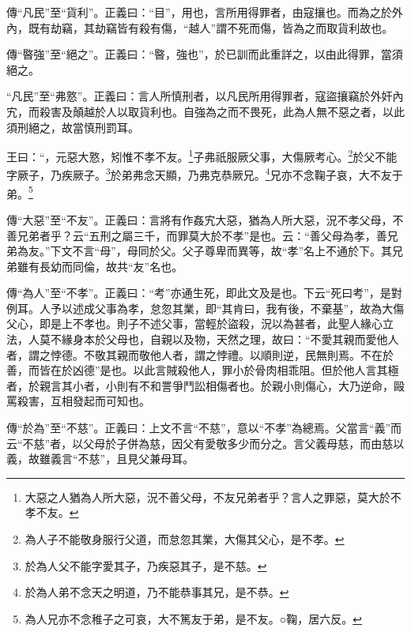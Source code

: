 {\noindent\zhuan{}\fzbyks 傳“凡民”至“貨利”。正義曰：“目”，用也，言所用得罪者，由寇攘也。而為之於外內，既有劫竊，其劫竊皆有殺有傷，“越人”謂不死而傷，皆為之而取貨利故也。 \par}

{\noindent\zhuan{}\fzbyks 傳“暋強”至“絕之”。正義曰：“暋，強也”，於已訓而此重詳之，以由此得罪，當須絕之。 \par}

{\noindent\shu{}\fzkt “凡民”至“弗憝”。正義曰：言人所慎刑者，以凡民所用得罪者，寇盜攘竊於外奸內宄，而殺害及顛越於人以取貨利也。自強為之而不畏死，此為人無不惡之者，以此須刑絕之，故當慎刑罰耳。 \par}

王曰：“，元惡大憝，矧惟不孝不友。\footnote{大惡之人猶為人所大惡，況不善父母，不友兄弟者乎？言人之罪惡，莫大於不孝不友。}子弗祇服厥父事，大傷厥考心。\footnote{為人子不能敬身服行父道，而怠忽其業，大傷其父心，是不孝。}於父不能字厥子，乃疾厥子。\footnote{於為人父不能字愛其子，乃疾惡其子，是不慈。}於弟弗念天顯，乃弗克恭厥兄。\footnote{於為人弟不念天之明道，乃不能恭事其兄，是不恭。}兄亦不念鞠子哀，大不友于弟。\footnote{為人兄亦不念稚子之可哀，大不篤友于弟，是不友。○鞠，居六反。}


{\noindent\zhuan{}\fzbyks 傳“大惡”至“不友”。正義曰：言將有作姦宄大惡，猶為人所大惡，況不孝父母，不善兄弟者乎？云“五刑之屬三千，而罪莫大於不孝”是也。云：“善父母為孝，善兄弟為友。”下文不言“母”，母同於父。父子尊卑而異等，故“孝”名上不通於下。其兄弟雖有長幼而同倫，故共“友”名也。 \par}

{\noindent\zhuan{}\fzbyks 傳“為人”至“不孝”。正義曰：“考”亦通生死，即此文及是也。下云“死曰考”，是對例耳。人予以述成父事為孝，怠忽其業，即“其肯曰，我有後，不棄基”，故為大傷父心，即是上不孝也。則子不述父事，當輕於盜殺，況以為甚者，此聖人緣心立法，人莫不緣身本於父母也，自親以及物，天然之理，故曰：“不愛其親而愛他人者，謂之悖德。不敬其親而敬他人者，謂之悖禮。以順則逆，民無則焉。不在於善，而皆在於凶德”是也。以此言賊殺他人，罪小於骨肉相乖阻。但於他人言其極者，於親言其小者，小則有不和詈爭鬥訟相傷者也。於親小則傷心，大乃逆命，毆罵殺害，互相發起而可知也。 \par}

{\noindent\zhuan{}\fzbyks 傳“於為”至“不慈”。正義曰：上文不言“不慈”，意以“不孝”為總焉。父當言“義”而云“不慈”者，以父母於子併為慈，因父有愛敬多少而分之。言父義母慈，而由慈以義，故雖義言“不慈”，且見父兼母耳。 \par}

